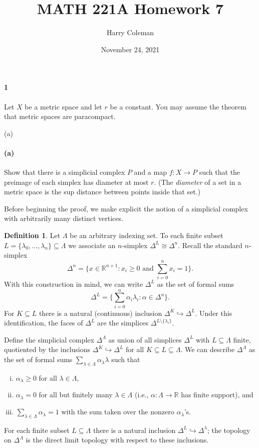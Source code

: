 \documentclass[12pt]{article}
\renewcommand{\maketitle}{\thispagestyle{title}}
\newlength{\myparskip}
\newenvironment{fullbox}{\begin{lrbox}{\savefullbox}\begin{minipage}{\dimexpr\textwidth-2\fboxsep\relax}\setlength{\parskip}{\myparskip}}{\end{minipage}\end{lrbox}\framebox[\textwidth]{\usebox{\savefullbox}}}
\newenvironment{pbox}[1][]{\begin{fullbox}\ifx#1\empty\else\paragraph{#1}\phantom{}\fi}{\end{fullbox}}
\theoremstyle{definition}
\newtheorem{definition}{Definition}
\newcommand{\R}{\mathbb{R}}
\newcommand{\<}{\langle}
\renewcommand{\>}{\rangle}
\newcommand{\isom}{\cong}
\newcommand{\inc}{\hookrightarrow}
\newcommand{\tsum}{{\textstyle\sum}}
\begin{document}
\title{MATH 221A Homework 7}
\author{Harry Coleman}
\date{November 24, 2021}
\maketitle

\begin{pbox}[1]
    Let $X$ be a metric space and let $r$ be a constant. You may assume the theorem that metric spaces are paracompact.
\end{pbox}

\begin{pbox}[(a)]
    Show that there is a simplicial complex $P$ and a map $f:X \to P$ such
    that the preimage of each simplex has diameter at most $r$.  (The
    \emph{diameter} of a set in a metric space is the sup distance between points
    inside that set.)
\end{pbox}

Before beginning the proof, we make explicit the notion of a simplicial complex with arbitrarily many distinct vertices.

\begin{definition}
    Let $\Lambda$ be an arbitrary indexing set. To each finite subset $L = \{\lambda_0, \dots, \lambda_n\} \subseteq \Lambda$ we associate an $n$-simplex $\Delta^L \isom \Delta^n$. Recall the standard $n$-simplex
    \[
        \Delta^n = \big\{x \in \R^{n+1} : x_i \geq 0 \text{ and } \tsum_{i=0}^{n} x_i = 1\big\}.
    \]
    With this construction in mind, we can write $\Delta^L$ as the set of formal sums
    \[
        \Delta^L = \big\{\tsum_{i=0}^{n} \alpha_i \lambda_i : \alpha \in \Delta^n\big\}.
    \]
    For $K \subseteq L$ there is a natural (continuous) inclusion $\Delta^K \inc \Delta^L$.
    Under this identification, the faces of $\Delta^L$ are the simplices $\Delta^{L \setminus \{\lambda_i\}}$.

    Define the simplicial complex $\Delta^\Lambda$ as union of all simplices $\Delta^L$ with $L \subseteq \Lambda$ finite, quotiented by the inclusions $\Delta^K \inc \Delta^L$ for all $K \subseteq L \subseteq \Lambda$.
    We can describe $\Delta^\Lambda$ as the set of formal sums $\sum_{\lambda \in \Lambda} \alpha_\lambda \lambda$ such that
    \begin{enumerate}[(i)]
        \item $\alpha_\lambda \geq 0$ for all $\lambda \in \Lambda$,
        \item  $\alpha_\lambda = 0$ for all but finitely many $\lambda \in \Lambda$ (i.e., $\alpha : \Lambda \to \R$ has finite support), and
        \item $\sum_{\lambda \in \Lambda} \alpha_\lambda = 1$ with the sum taken over the nonzero $\alpha_\lambda$'s.
    \end{enumerate}
    For each finite subset $L \subseteq \Lambda$ there is a natural inclusion $\Delta^L \inc \Delta^\lambda$; the topology on $\Delta^\Lambda$ is the direct limit topology with respect to these inclusions.
\end{definition}
\end{document}

